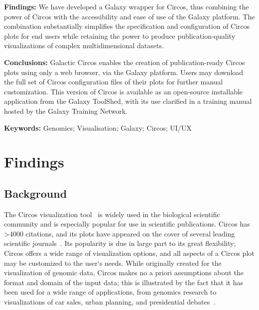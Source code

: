 \textbf{Findings:}
We have developed a Galaxy wrapper for Circos, thus combining the power of Circos with the accessibility and ease of use of the Galaxy platform. The combination substantially simplifies the specification and configuration of Circos plots for end users while retaining the power to produce publication-quality visualizations of complex multidimensional datasets.

\textbf{Conclusions:}
Galactic Circos enables the creation of publication-ready Circos plots using only a web browser, via the Galaxy platform. Users may download the full set of Circos configuration files of their plots for further manual customization. This version of Circos is available as an open-source installable application from the Galaxy ToolShed, with its use clarified in a training manual hosted by the Galaxy Training Network.

\textbf{Keywords: } Genomics; Visualisation; Galaxy; Circos; UI/UX


\section*{Findings}

\subsection*{Background}


The Circos visualization tool~\cite{krzywinski2009} is widely used in the biological scientific community and is especially popular for use in scientific publications. Circos has >4000 citations, and its plots have appeared on the cover of several leading scientific journals~\cite{circospubs}.  Its popularity is due in large part to its great flexibility; Circos offers a wide range of visualization options, and all aspects of a Circos plot may be customized to the user`s needs. While originally created for the visualization of genomic data, Circos makes no a priori assumptions about the format and domain of the input data; this is illustrated by the fact that it has been used for a wide range of applications, from genomics research to visualizations of car sales, urban planning, and presidential debates~\cite{circosnongenomic}.


